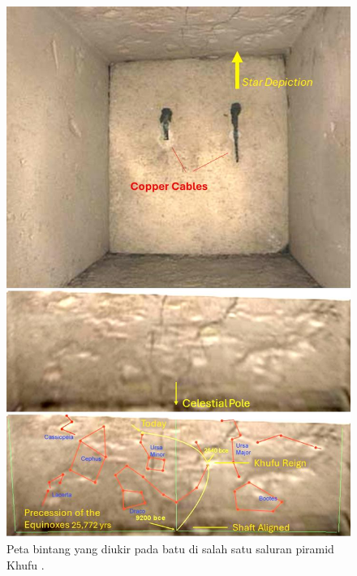 \documentclass[10pt,twocolumn,letterpaper]{article}
\begin{document}
\begin{figure}[H]
\begin{center}
   \includegraphics[width=1\linewidth]{star-stone.jpg}
\end{center}
   \caption{Peta bintang yang diukir pada batu di salah satu saluran piramid Khufu \cite{28}.}
\label{fig:20}
\label{fig:onecol}
\end{figure}
\end{document}
